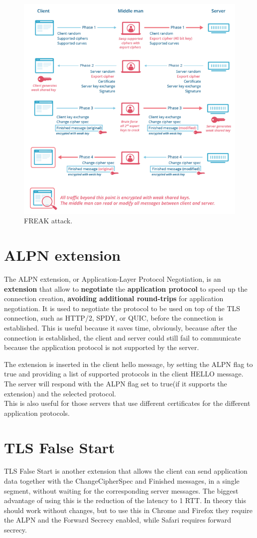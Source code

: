\begin{figure}[H]
  \centering
  \includegraphics[width=.6\textwidth]{img/FREAK attack.png}
  \caption{FREAK attack.}
  \label{fig:freak-attack}
\end{figure}

\section{ALPN extension}
The ALPN extension, or Application-Layer Protocol Negotiation, is an
\textbf{extension} that allow to \textbf{negotiate} the
\textbf{application protocol} to speed up the connection creation,
\textbf{avoiding additional round-trips} for application negotiation.
It is used to negotiate the protocol to be used on top of the TLS
connection, such as HTTP/2, SPDY, or QUIC, before the connection is
established. This is useful because it saves time, obviously, because
after the connection is established, the client and server could still
fail to communicate because the application protocol is not supported
by the server.

The extension is inserted in the client hello message, by setting the
ALPN flag to true and providing a list of supported protocols in the
client HELLO message. The server will respond with the ALPN flag set
to true(if it supports the extension) and the selected protocol.\\
This is also useful for those servers that use different certificates
for the different application protocols.

\section{TLS False Start}
TLS False Start is another extension that allows the client can send
application data together with the ChangeCipherSpec and Finished
messages, in a single segment, without waiting for the corresponding
server messages. The biggest advantage of using this is the reduction
of the latency to 1 RTT. In theory this should work without changes,
but to use this in Chrome and Firefox they require the ALPN and the 
Forward Secrecy enabled, while Safari requires forward secrecy.

